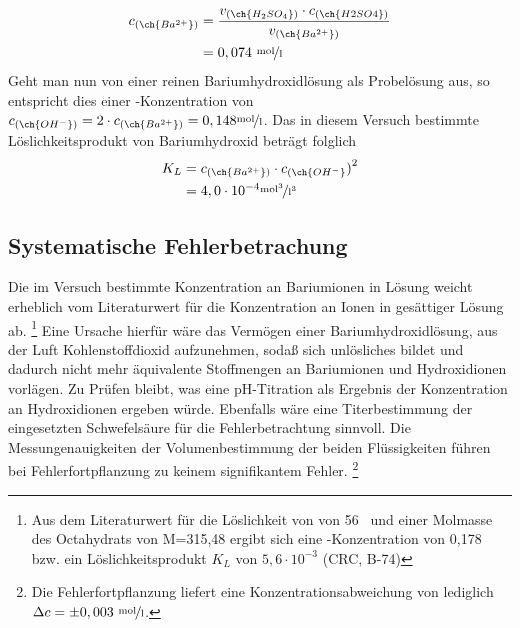 \documentclass[11pt,titlepage]{scrartcl}		%
\begin{document}
%
\begin{align*}
	c_{(\ch{Ba^{2+}})} &= \frac{v_{(\ch{H_2SO_4})} \cdot c_{(\ch{H2SO4})}}{v_{(\ch{Ba^{2+}})}} \\
    	&= 0,074~ \unitfrac{mol}{l}
\end{align*}
%
Geht man nun von einer reinen Bariumhydroxidlösung als Probelösung aus, so entspricht dies einer -Konzentration von $c_{(\ch{OH^-})} = 2 \cdot c_{(\ch{Ba^{2+}})} = 0,148 \unitfrac{mol}{l}$. Das in diesem Versuch bestimmte Löslichkeitsprodukt von Bariumhydroxid beträgt folglich
%
\begin{align*}
	K_L &= c_{(\ch{Ba^{2+}})} \cdot {c_{(\ch{OH^-}})}^2 \\
	&= 4,0 \cdot 10^{-4} \unitfrac{mol^3}{l^3}
\end{align*}	
%
%
%
\subsection{Systematische Fehlerbetrachung}
Die im Versuch bestimmte Konzentration an Bariumionen in Lösung weicht erheblich vom Literaturwert für die Konzentration an Ionen in gesättiger Lösung ab. \footnote{Aus dem Literaturwert für die Löslichkeit von  von 56~ und einer Molmasse des Octahydrats von M=315,48  ergibt sich eine -Konzentration von 0,178~ bzw. ein Löslichkeitsprodukt $K_L$ von $5,6 \cdot 10^{-3}$ (\textsc{CRC}, B-74)} Eine Ursache hierfür wäre das Vermögen einer Bariumhydroxidlösung, aus der Luft Kohlenstoffdioxid aufzunehmen, sodaß sich unlösliches  bildet und dadurch nicht mehr äquivalente Stoffmengen an Bariumionen und Hydroxidionen vorlägen. Zu Prüfen bleibt, was eine pH-Titration als Ergebnis der Konzentration an Hydroxidionen ergeben würde. Ebenfalls wäre eine Titerbestimmung der eingesetzten Schwefelsäure für die Fehlerbetrachtung sinnvoll.
Die Messungenauigkeiten der Volumenbestimmung der beiden Flüssigkeiten führen bei Fehlerfortpflanzung zu keinem signifikantem Fehler. \footnote{Die Fehlerfortpflanzung liefert eine Konzentrationsabweichung von lediglich $\Delta c = \pm 0,003~\unitfrac{mol}{l}$.}
%
%
%
\newpage
\end{document}
